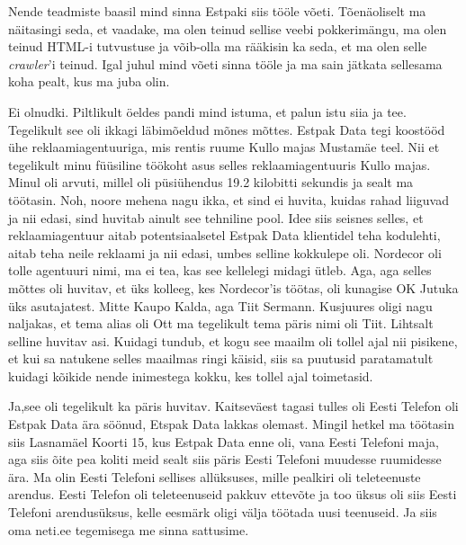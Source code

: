 Nende teadmiste baasil mind sinna Estpaki  siis tööle võeti. Tõenäoliselt ma  näitasingi seda, et vaadake, ma olen teinud sellise veebi pokkerimängu, ma olen teinud HTML-i tutvustuse ja võib-olla ma rääkisin ka seda, et ma olen selle \emph{crawler}'i teinud. Igal juhul mind võeti sinna tööle ja ma sain jätkata sellesama koha pealt, kus ma juba olin.


Ei olnudki. Piltlikult öeldes pandi mind  istuma, et palun istu siia ja tee. Tegelikult  see oli ikkagi läbimõeldud mõnes mõttes. Estpak Data tegi koostööd ühe reklaamiagentuuriga, mis rentis ruume Kullo majas Mustamäe teel. Nii et tegelikult minu füüsiline töökoht  asus selles reklaamiagentuuris Kullo majas. Minul oli arvuti, millel oli püsiühendus 19.2 kilobitti sekundis ja sealt ma töötasin. Noh, noore mehena nagu ikka, et sind ei huvita, kuidas rahad liiguvad ja nii edasi,  sind huvitab ainult see tehniline pool. Idee siis seisnes selles, et reklaamiagentuur aitab potentsiaalsetel Estpak Data klientidel teha kodulehti, aitab teha neile reklaami ja nii edasi, umbes selline kokkulepe oli. Nordecor oli tolle agentuuri nimi, ma ei tea, kas see kellelegi midagi ütleb. Aga, aga selles mõttes oli huvitav, et üks kolleeg, kes Nordecor'is töötas, oli kunagise OK Jutuka üks asutajatest. Mitte  Kaupo Kalda, aga Tiit Sermann. Kusjuures oligi nagu naljakas, et tema alias oli Ott ma tegelikult tema päris nimi oli Tiit. Lihtsalt selline huvitav asi. Kuidagi tundub, et kogu see maailm oli tollel ajal nii pisikene, et kui sa natukene selles maailmas ringi käisid, siis sa puutusid paratamatult kuidagi kõikide nende inimestega kokku, kes tollel ajal toimetasid.


Ja,see oli tegelikult ka päris huvitav. Kaitseväest tagasi tulles oli Eesti Telefon oli Estpak Data ära söönud, Etspak Data lakkas olemast. Mingil hetkel ma töötasin siis Lasnamäel Koorti 15, kus Estpak Data enne oli, vana Eesti Telefoni maja, aga siis õite pea koliti meid sealt siis päris Eesti Telefoni muudesse ruumidesse ära. Ma olin Eesti Telefoni sellises allüksuses, mille pealkiri oli teleteenuste arendus.  Eesti Telefon oli teleteenuseid pakkuv ettevõte ja too üksus oli siis Eesti Telefoni arendusüksus, kelle eesmärk oligi välja töötada uusi teenuseid. Ja siis oma neti.ee tegemisega me sinna sattusime. 

